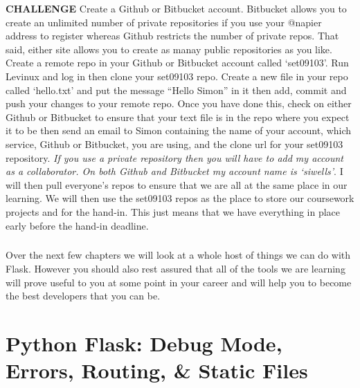 \documentclass[12pt, a4paper, twoside]{book}
\begin{document}
\begin{framed}
\textbf{CHALLENGE} Create a Github or Bitbucket account. Bitbucket allows you to create an unlimited number of private repositories if you use your @napier address to register whereas Github restricts the number of private repos. That said, either site allows you to create as manay public repositories as you like. Create a remote repo in your Github or Bitbucket account called `set09103'. Run Levinux and log in then clone your set09103 repo. Create a new file in your repo called `hello.txt' and put the message ``Hello Simon'' in it then add, commit and push your changes to your remote repo. Once you have done this, check on either Github or Bitbucket to ensure that your text file is in the repo where you expect it to be then send an email to Simon containing the name of your account, which service, Github or Bitbucket, you are using, and the clone url for your set09103 repository. {\emph{If you use a private repository then you will have to add my account as a collaborator. On both Github and Bitbucket my account name is `siwells'}}. I will then pull everyone's repos to ensure that we are all at the same place in our learning. We will then use the set09103 repos as the place to store our coursework projects and for the hand-in. This just means that we have everything in place early before the hand-in deadline.
\end{framed}

\paragraph{} Over the next few chapters we will look at a whole host of things we can do with Flask. However you should also rest assured that all of the tools we are learning will prove useful to you at some point in your career and will help you to become the best developers that you can be.



\chapter{Python Flask: Debug Mode, Errors, Routing, \& Static Files}
\label{lab3}
\end{document}
